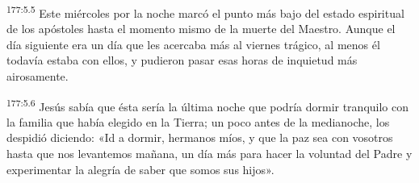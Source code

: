 \par 
\textsuperscript{177:5.5} Este miércoles por la noche marcó el punto más bajo del estado espiritual de los apóstoles hasta el momento mismo de la muerte del Maestro. Aunque el día siguiente era un día que les acercaba más al viernes trágico, al menos él todavía estaba con ellos, y pudieron pasar esas horas de inquietud más airosamente.

\par 
\textsuperscript{177:5.6} Jesús sabía que ésta sería la última noche que podría dormir tranquilo con la familia que había elegido en la Tierra; un poco antes de la medianoche, los despidió diciendo: «Id a dormir, hermanos míos, y que la paz sea con vosotros hasta que nos levantemos mañana, un día más para hacer la voluntad del Padre y experimentar la alegría de saber que somos sus hijos».